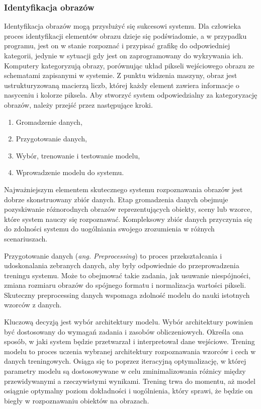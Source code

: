 \documentclass[12pt,a4paper,twoside]{article}
\begin{document}
\subsubsection{Identyfikacja obrazów}
Identyfikacja obrazów mogą przysłużyć się sukcesowi systemu. Dla człowieka proces identyfikacji elementów obrazu dzieje się podświadomie, a w przypadku programu, jest on w stanie rozpoznać i przypisać grafikę do odpowiedniej kategorii, jedynie w sytuacji gdy jest on zaprogramowany do wykrywania ich. Komputery kategoryzują obrazy, porównując układ pikseli wejściowego obrazu ze schematami zapisanymi w systemie. Z punktu widzenia maszyny, obraz jest ustrukturyzowaną macierzą liczb, której każdy element zawiera informacje o nasyceniu i kolorze piksela. Aby stworzyć system odpowiedzialny za kategoryzację obrazów, należy przejść przez następujące kroki.
\begin{enumerate}
	\item Gromadzenie danych,
	\item Przygotowanie danych,
	\item Wybór, trenowanie i testowanie modelu,
	\item Wprowadzenie modelu do systemu.
\end{enumerate}
Najważniejszym elementem skutecznego systemu rozpoznawania obrazów jest dobrze skonstruowany zbiór danych. Etap gromadzenia danych obejmuje pozyskiwanie różnorodnych obrazów reprezentujących obiekty, sceny lub wzorce, które system nauczy się rozpoznawać. Kompleksowy zbiór danych przyczynia się do zdolności systemu do uogólniania swojego zrozumienia w różnych scenariuszach.\par
Przygotowanie danych (\textit{ang. Preprocessing}) to proces przekształcania i udoskonalania zebranych danych, aby były odpowiednie do przeprowadzenia treningu systemu. Może to obejmować takie zadania, jak usuwanie niespójności, zmiana rozmiaru obrazów do spójnego formatu i normalizacja wartości pikseli. Skuteczny preprocessing danych wspomaga zdolność modelu do nauki istotnych wzorców z danych.\par
Kluczową decyzją jest wybór architektury modelu. Wybór architektury powinien być dostosowany do wymagań zadania i zasobów obliczeniowych. Określa ona sposób, w jaki system będzie przetwarzał i interpretował dane wejściowe. Trening modelu to proces uczenia wybranej architektury rozpoznawania wzorców i cech w danych treningowych. Osiąga się to poprzez iteracyjną optymalizację, w której parametry modelu są dostosowywane w celu zminimalizowania różnicy między przewidywanymi a rzeczywistymi wynikami. Trening trwa do momentu, aż model osiągnie optymalny poziom dokładności i uogólnienia, który sprawi, że będzie on biegły w rozpoznawaniu obiektów na obrazach. \par
\end{document}
